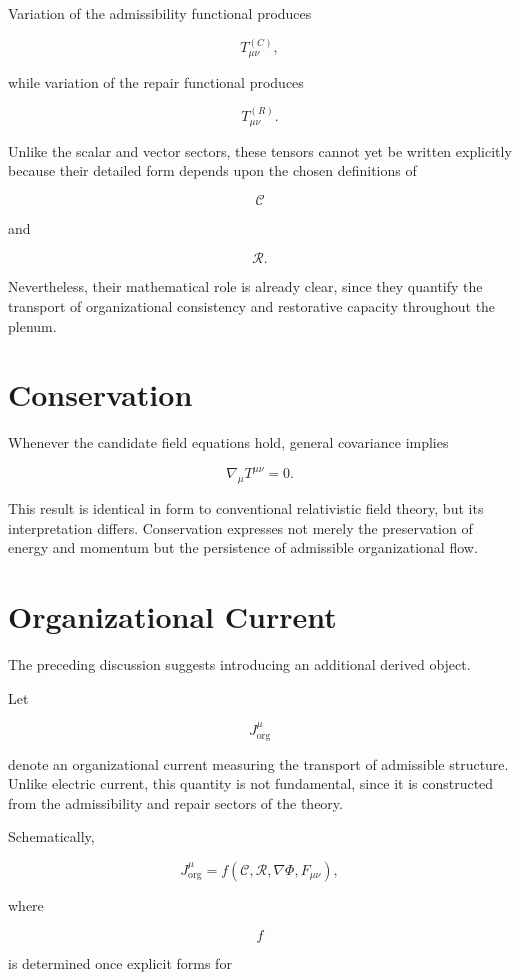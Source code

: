 \documentclass[11pt,oneside]{book}
\numberwithin{equation}{chapter}
\theoremstyle{definition}
\theoremstyle{plain}
\begin{document}
Variation of the admissibility functional produces

\[
T^{(C)}_{\mu\nu},
\]

while variation of the repair functional produces

\[
T^{(R)}_{\mu\nu}.
\]

Unlike the scalar and vector sectors, these tensors cannot yet be written
explicitly because their detailed form depends upon the chosen definitions
of

\[
\mathcal C
\]

and

\[
\mathcal R.
\]

Nevertheless, their mathematical role is already clear, since they quantify the transport of organizational consistency and restorative capacity throughout the plenum.

\section{Conservation}

Whenever the candidate field equations hold, general covariance implies

\[
\boxed{
\nabla_\mu
T^{\mu\nu}
=
0.
}
\]

This result is identical in form to conventional relativistic field theory, but its interpretation differs. Conservation expresses not merely the preservation of energy and momentum but the persistence of admissible organizational flow.

\section{Organizational Current}

The preceding discussion suggests introducing an additional derived object.

Let

\[
J^\mu_{\mathrm{org}}
\]

denote an organizational current measuring the transport of admissible structure. Unlike electric current, this quantity is not fundamental, since it is constructed from the admissibility and repair sectors of the theory.

Schematically,

\[
J^\mu_{\mathrm{org}}
=
f
\left(
\mathcal C,
\mathcal R,
\nabla\Phi,
F_{\mu\nu}
\right),
\]

where

\[
f
\]

is determined once explicit forms for
\end{document}
